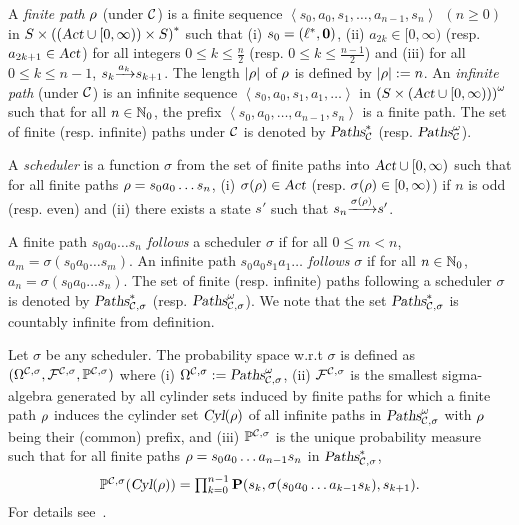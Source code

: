 \smallskip {}
A \emph{finite path} $\rho$ (under $\mathcal{C}$) is a finite sequence
$
\left\langle s_0,a_0,s_1,\dots,a_{n-1},s_n\right\rangle~~(n\ge 0)
$
in
$S\times{\left((\mbox{\sl Act}\cup[0,\infty))\times S\right)}^*$
such that (i) $s_0=(\ell^*,\mathbf{0})$,
(ii) $a_{2k}\in [0,\infty)$ (resp. $a_{2k+1}\in \mbox{\sl Act}$) for all integers $0\le k\le \frac{n}{2}$ (resp. $0\le k\le \frac{n-1}{2}$) and
(iii) for all $0\le k\le n-1$, ${s_k}{\xrightarrow{a_k}}{s_{k+1}}$.
The length $\left| \rho \right|$ of $\rho$ is defined by $\left| \rho \right|:=n$.
An \emph{infinite path} (under $\mathcal{C}$) is an infinite sequence
$
\left\langle s_0,a_0,s_1,a_1,\dots\right\rangle
$
in
${\left(S\times(\mbox{\sl Act}\cup[0,\infty))\right)}^\omega$
such that for all $n\in\mathbb{N}_0$, the prefix $\left\langle s_0,a_0,\dots,a_{n-1},s_n\right\rangle$ is a finite path.
The set of finite (resp. infinite) paths  under $\mathcal{C}$ is denoted by $\mbox{\sl Paths}^*_{\mathcal{C}}$ (resp. $\mbox{\sl Paths}^\omega_{\mathcal{C}}$).

\smallskip {}
A \emph{scheduler} is a function $\sigma$ from the set of finite paths into $\mbox{\sl Act}\cup [0,\infty)$ such that for all finite paths $\rho=s_0a_0\dots s_n$,
(i) $\sigma(\rho)\in\mbox{\sl Act}$ (resp. $\sigma(\rho)\in  [0,\infty)$) if $n$ is odd (resp. even) and (ii)
there exists a state $s'$ such that ${s_n}{\xrightarrow{\sigma(\rho)}}{s'}$.

\smallskip{}
A finite path $s_0a_0\dots s_n$ \emph{follows} a scheduler $\sigma$ if for all $0\le m< n$, $a_m=\sigma\left(s_0a_0\dots s_m\right)$.
An infinite path $s_0a_0s_1a_1\dots$ \emph{follows} $\sigma$ if for all $n\in\mathbb{N}_0$, $a_n=\sigma\left(s_0a_0\dots s_n\right)$.
The set of finite (resp. infinite) paths following a scheduler $\sigma$ is denoted by $\mbox{\sl Paths}^*_{\mathcal{C},\sigma}$ (resp. $\mbox{\sl Paths}^\omega_{\mathcal{C},\sigma}$).
We note that the set $\mbox{\sl Paths}^*_{\mathcal{C},\sigma}$ is countably infinite from definition.

\smallskip {}
Let $\sigma$ be any scheduler.
The probability space w.r.t $\sigma$ is defined as
$
(\Omega^{\mathcal{C},\sigma}, \mathcal{F}^{\mathcal{C},\sigma}, \mathbb{P}^{\mathcal{C},\sigma})
$
where (i) $\Omega^{\mathcal{C},\sigma}:=\mbox{\sl Paths}^\omega_{\mathcal{C},\sigma}$, (ii) $\mathcal{F}^{\mathcal{C},\sigma}$ is the smallest sigma-algebra generated by all cylinder sets induced by finite paths for which
a finite path $\rho$ induces the cylinder set $\mbox{\sl Cyl}(\rho)$ of all infinite paths in $\mbox{\sl Paths}^\omega_{\mathcal{C},\sigma}$ with $\rho$ being their (common) prefix,
and (iii) $\mathbb{P}^{\mathcal{C},\sigma}$ is the unique probability measure such that for all finite paths $\rho=s_0a_0\dots a_{n-1}s_n$ in $\mbox{\sl Paths}^*_{\mathcal{C},\sigma}$,
\[
\textstyle{\mathbb{P}^{\mathcal{C},\sigma}(\mbox{\sl Cyl}(\rho))=\prod_{k=0}^{n-1} \mathbf{P}(s_k, \sigma(s_0a_0\dots a_{k-1}s_k), s_{k+1}).}
\]
For details see~\cite{DBLP:journals/tcs/KwiatkowskaNSS02}.

